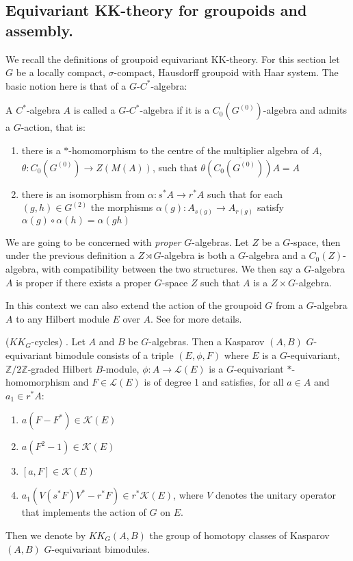 \begin{conjecture}
{\section{Equivariant KK-theory for groupoids and assembly.}
We recall the definitions of groupoid equivariant KK-theory. For this section let $G$ be a locally compact, $\sigma$-compact, Hausdorff groupoid with Haar system. The basic notion here is that of a $G$-$C^{*}$-algebra:
\begin{definition}
A $C^{*}$-algebra $A$ is called a $G$-$C^{*}$-algebra if it is a $C_{0}(G^{(0)})$-algebra and admits a $G$-action, that is:
\begin{enumerate}
\item there is a $*$-homomorphism to the centre of the multiplier algebra of $A$, $\theta: C_{0}(G^{(0)}) \rightarrow Z(M(A))$, such that $\overline{\theta(C_{0}(G^{(0)}))A} = A$
\item there is an isomorphism from $\alpha: s^{*}A \rightarrow r^{*}A$ such that for each $(g,h) \in G^{(2)}$ the morphisms $\alpha(g):A_{s(g)} \rightarrow A_{r(g)}$ satisfy $\alpha(g)\circ \alpha(h) = \alpha(gh)$
\end{enumerate}
We are going to be concerned with \textit{proper} $G$-algebras. Let $Z$ be a $G$-space, then under the previous definition a $Z\rtimes G$-algebra is both a $G$-algebra and a $C_{0}(Z)$-algebra, with compatibility between the two structures. We then say a $G$-algebra $A$ is proper if there exists a proper $G$-space $Z$ such that $A$ is a $Z\times G$-algebra.
\end{definition}

In this context we can also extend the action of the groupoid $G$ from a $G$-algebra $A$ to any Hilbert module $E$ over $A$. See \cite{MR1798599} for more details.

\begin{definition}($KK_{G}$-cycles) \cite{MR1686846,MR1703305,MR1798599}.
Let $A$ and $B$ be $G$-algebras. Then a Kasparov $(A,B)$ $G$-equivariant bimodule consists of a triple $(E,\phi, F)$ where $E$ is a $G$-equivariant, $\mathbb{Z}/2\mathbb{Z}$-graded Hilbert $B$-module, $\phi: A \rightarrow \mathcal{L}(E)$ is a $G$-equivariant $*$-homomorphism and $F\in \mathcal{L}(E)$ is of degree 1 and satisfies, for all $a \in A$ and $a_{1} \in r^{*}A$:
\begin{enumerate}
\item $a(F - F^{*}) \in \mathcal{K}(E)$
\item $a(F^{2}- 1) \in \mathcal{K}(E)$
\item $[a,F] \in \mathcal{K}(E)$
\item $a_{1}(V(s^{*}F)V^{*}-r^{*}F) \in r^{*}\mathcal{K}(E)$, where $V$ denotes the unitary operator that implements the action of $G$ on $E$.
\end{enumerate}
Then we denote by $KK_{G}(A,B)$ the group of homotopy classes of Kasparov $(A,B)$ $G$-equivariant bimodules. 
\end{definition}

}
\end{conjecture}
